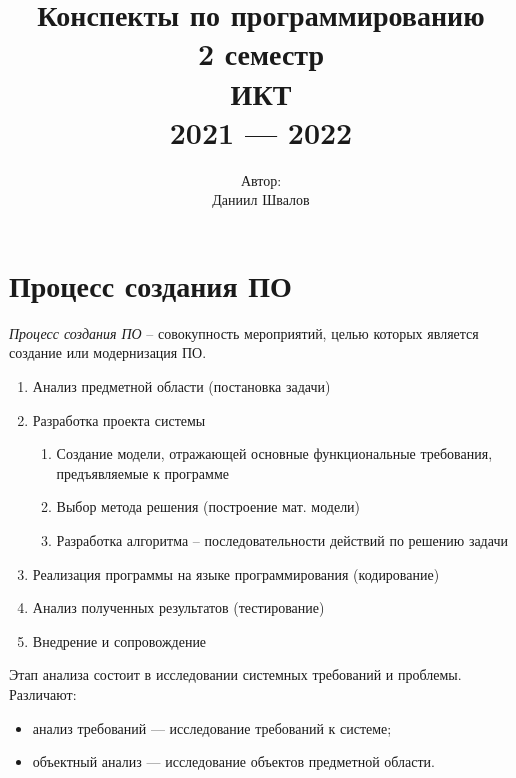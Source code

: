 \documentclass[a4paper,12pt,oneside]{extbook}
\title{
    Конспекты по программированию \\
    \vspace{2cm} 2 семестр \\
    \vspace{2cm} ИКТ \\
    2021 — 2022
    \vfill
}
\author{
    Автор: \\
    Даниил Швалов
}
\date{}
\begin{document}
\begin{titlepage}
    \pagestyle{empty} \cleardoublepage
    \maketitle
    \thispagestyle{empty}
\end{titlepage}

\setcounter{page}{2} { \setcounter{tocdepth}{4} \hypersetup{linkcolor=black}
    \tableofcontents
}

\newpage

\section{Процесс создания ПО}%
\label{sec:Процесс создания ПО}

\textit{Процесс создания ПО} – совокупность мероприятий, целью которых является
создание или модернизация ПО.

\begin{enumerate}
    \item Анализ предметной области (постановка задачи)
    \item Разработка проекта системы
          \begin{enumerate}
              \item Создание модели, отражающей основные функциональные требования,
                    предъявляемые к программе
              \item Выбор метода решения (построение мат. модели)
              \item Разработка алгоритма – последовательности действий по решению
                    задачи
          \end{enumerate}
    \item Реализация программы на языке программирования (кодирование)
    \item Анализ полученных результатов (тестирование)
    \item Внедрение и сопровождение
\end{enumerate}

Этап анализа состоит в исследовании системных требований и проблемы. Различают:
\begin{itemize}
    \item анализ требований — исследование требований к системе;
    \item объектный анализ — исследование объектов предметной области.
\end{itemize}
\end{document}
